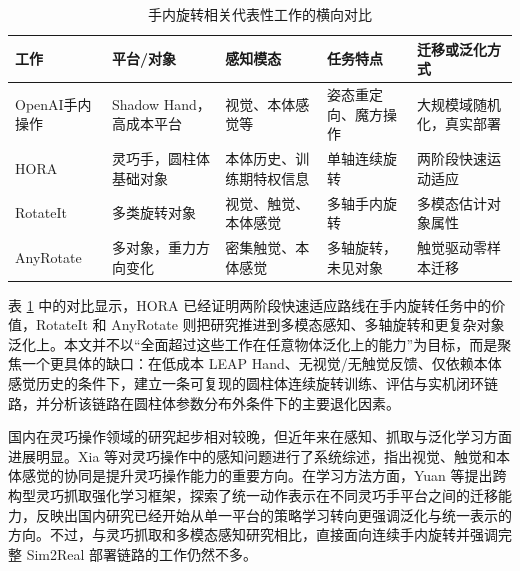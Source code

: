 \begin{table}[htbp]
    \centering
    \caption{手内旋转相关代表性工作的横向对比}
    \label{tab:chapter1_related_work_compare}
    \setlength{\tabcolsep}{3pt}
    \renewcommand{\arraystretch}{1.18}
    \begin{tabular}{
        >{\raggedright\arraybackslash}p{}
        >{\raggedright\arraybackslash}p{}
        >{\raggedright\arraybackslash}p{}
        >{\raggedright\arraybackslash}p{}
        >{\raggedright\arraybackslash}p{}
    }
        \toprule
        工作 & 平台/对象 & 感知模态 & 任务特点 & 迁移或泛化方式 \\
        \midrule
        OpenAI手内操作\cite{openai2018,openai2019} & Shadow Hand，高成本平台 & 视觉、本体感觉等 & 姿态重定向、魔方操作 & 大规模域随机化，真实部署 \\
        HORA\cite{hora2022} & 灵巧手，圆柱体基础对象 & 本体历史、训练期特权信息 & 单轴连续旋转 & 两阶段快速运动适应 \\
        RotateIt\cite{rotateit2023} & 多类旋转对象 & 视觉、触觉、本体感觉 & 多轴手内旋转 & 多模态估计对象属性 \\
        AnyRotate\cite{anyrotate2024} & 多对象，重力方向变化 & 密集触觉、本体感觉 & 多轴旋转，未见对象 & 触觉驱动零样本迁移 \\
        \bottomrule
    \end{tabular}
\end{table}

表 \ref{tab:chapter1_related_work_compare} 中的对比显示，HORA 已经证明两阶段快速适应路线在手内旋转任务中的价值，RotateIt 和 AnyRotate 则把研究推进到多模态感知、多轴旋转和更复杂对象泛化上。本文并不以“全面超过这些工作在任意物体泛化上的能力”为目标，而是聚焦一个更具体的缺口：在低成本 LEAP Hand、无视觉/无触觉反馈、仅依赖本体感觉历史的条件下，建立一条可复现的圆柱体连续旋转训练、评估与实机闭环链路，并分析该链路在圆柱体参数分布外条件下的主要退化因素。

国内在灵巧操作领域的研究起步相对较晚，但近年来在感知、抓取与泛化学习方面进展明显。Xia 等对灵巧操作中的感知问题进行了系统综述，指出视觉、触觉和本体感觉的协同是提升灵巧操作能力的重要方向\cite{xia2022}。在学习方法方面，Yuan 等提出跨构型灵巧抓取强化学习框架，探索了统一动作表示在不同灵巧手平台之间的迁移能力，反映出国内研究已经开始从单一平台的策略学习转向更强调泛化与统一表示的方向\cite{yuan2025}。不过，与灵巧抓取和多模态感知研究相比，直接面向连续手内旋转并强调完整 Sim2Real 部署链路的工作仍然不多。

